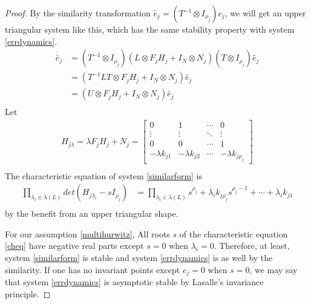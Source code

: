 \documentclass[11pt, a4paper, oneside, openany, reqno]{book}
\theoremstyle{definition}
\theoremstyle{remark}
\numberwithin{equation}{chapter} %
\begin{document}
\begin{proof}
	By the similarity transformation $ \tilde{e_j}=(T^{-1} \otimes I_{\rho_j}) e_j$, 
	we will get an upper triangular system like this,
	which has the same stability property with system \eqref{errdynamics}.
	\begin{equation}\begin{split}\label{similarform}	
		\dot{\tilde{e_j}} &= (T^{-1} \otimes I_{\rho_j}) 
			( L \otimes F_j H_j  + I_N \otimes N_j  ) 
			(T \otimes I_{\rho_j}) \tilde{e_j} \\
		&= 	( T^{-1} L T \otimes F_j H_j  + I_N \otimes N_j  ) \tilde{e_j} \\
		&= 	( U \otimes F_j H_j  + I_N \otimes N_j  ) \tilde{e_j} \\
	\end{split}\end{equation}	
	Let
	\begin{equation}\begin{split}		
	H_{j\lambda} = \lambda F_j H_j  +N_j  = \left[\begin{array}{cccc}
		0 & 1 & \cdots & 0\\
		\vdots & \vdots & \ddots & \vdots\\
		0 & 0 & \cdots & 1\\
		-\lambda k_{j1} & -\lambda k_{j2} & \cdots & -\lambda k_{j\rho_j}\end{array}\right] \\
	\end{split}\end{equation}
	The characteristic equation of system \eqref{similarform} is 
	\begin{equation}\begin{split}\label{cheq}
		\prod_{\lambda_i \in \lambda(L)}  det(H_{j\lambda_i} -sI_{\rho_j} )
		&= \prod_{\lambda_i \in \lambda(L)} 
		s^{\rho_j} + \lambda_i k_{j\rho_j} s^{\rho_j-1} + \cdots + \lambda_i k_{j1} \\	
	\end{split}\end{equation}
	by the benefit from an upper triangular shape.
	
	For our assumption \eqref{multihurwitz}, 
	All roots $ s $ of the characteristic equation \eqref{cheq} 
	have negative real parts except $ s=0 $ when $ \lambda_i=0 $. 
	Therefore, at least, system \eqref{similarform} is stable 
	and system \eqref{errdynamics} is as well by the similarity.
	If one has no invariant points except $ {e_j} =0 $ when $ s=0 $,
	we may say that system \eqref{errdynamics} is asymptotic stable 
	by Lasalle's invariance principle\cite{khalil}.
	

\end{proof}
\end{document}
